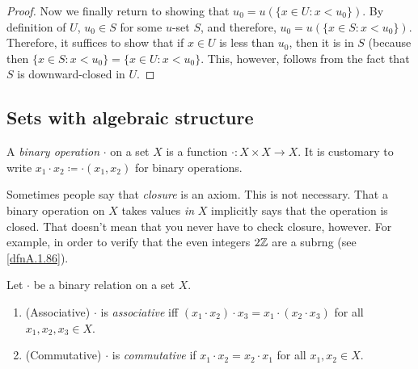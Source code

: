 \begin{thm}
\begin{proof}
Now we finally return to showing that $u_0=u\left( \{ x\in U:x<u_0\} \right)$.  By definition of $U$, $u_0\in S$ for some $u$-set $S$, and therefore, $u_0=u\left( \{ x\in S:x<u_0\} \right)$.  Therefore, it suffices to show that if $x\in U$ is less than $u_0$, then it is in $S$ (because then $\{ x\in S:x<u_0\} =\{ x\in U:x<u_0\}$.  This, however, follows from the fact that $S$ is downward-closed in $U$.
\end{proof}
\end{thm}

\subsection{Sets with algebraic structure}

\begin{dfn}
A \emph{binary operation} $\cdot$ on a set $X$ is a function $\cdot :X\times X\rightarrow X$.  It is customary to write $x_1\cdot x_2\coloneqq \cdot (x_1,x_2)$ for binary operations.
\begin{rmk}
Sometimes people say that \emph{closure} is an axiom.  This is not necessary.  That a binary operation on $X$ takes values \emph{in} $X$ implicitly says that the operation is closed.  That doesn't mean that you never have to check closure, however.  For example, in order to verify that the even integers $2\mathbb{Z}$ are a subrng (see \cref{dfnA.1.86}).
\end{rmk}
\end{dfn}
\begin{dfn}
Let $\cdot$ be a binary relation on a set $X$.
\begin{enumerate}
\item (Associative) $\cdot$ is \emph{associative} iff $(x_1\cdot x_2)\cdot x_3=x_1\cdot (x_2\cdot x_3)$ for all $x_1,x_2,x_3\in X$.
\item (Commutative) $\cdot$ is \emph{commutative} if $x_1\cdot x_2=x_2\cdot x_1$ for all $x_1,x_2\in X$.
\end{enumerate}
\end{dfn}

